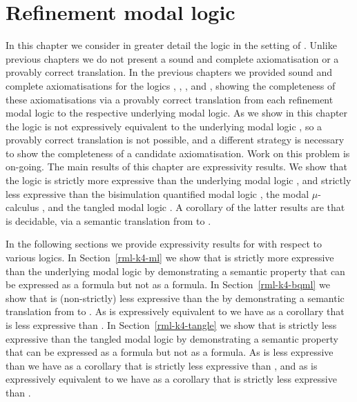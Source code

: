 \chapter{Refinement modal logic \classKF{}}\label{rml-k4}

In this chapter we consider in greater detail the logic \logicRmlKF{} in the setting of \classKF{}.
Unlike previous chapters we do not present a sound and complete axiomatisation or a provably correct translation.
In the previous chapters we provided sound and complete axiomatisations for the logics \logicRmlK{}, \logicRmlKFF{}, \logicRmlKD{}, and \logicRmlS{}, showing the completeness of these axiomatisations via a provably correct translation from each refinement modal logic to the respective underlying modal logic.
As we show in this chapter the logic \logicRmlKF{} is not expressively equivalent to the underlying modal logic \logicKF{}, so a provably correct translation is not possible, and a different strategy is necessary to show the completeness of a candidate axiomatisation.
Work on this problem is on-going.
The main results of this chapter are expressivity results.
We show that the logic \logicRmlKF{} is strictly more expressive than the underlying modal logic \logicKF{}, and strictly less expressive than the bisimulation quantified modal logic \logicBqmlKF{}, the modal $\mu$-calculus \logicMuKF{}, and the tangled modal logic \logicTangleKF{}.
A corollary of the latter results are that \logicRmlKF{} is decidable, via a semantic translation from \langRml{} to \langMu{}.

In the following sections we provide expressivity results for \logicRmlKF{} with respect to various logics.
In Section~\ref{rml-k4-ml} we show that \logicRmlKF{} is strictly more expressive than the underlying modal logic \logicKF{} by demonstrating a semantic property that can be expressed as a \langRml{} formula but not as a \langMl{} formula.
In Section~\ref{rml-k4-bqml} we show that \logicRmlKF{} is (non-strictly) less expressive than the \logicBqmlKF{} by demonstrating a semantic translation from \langRml{} to \langBqml{}.
As \logicBqmlKF{} is expressively equivalent to \logicMuKF{} we have as a corollary that \logicRmlKF{} is less expressive than \logicMuKF{}.
In Section~\ref{rml-k4-tangle} we show that \logicRmlKF{} is strictly less expressive than the tangled modal logic \logicTangleKF{} by demonstrating a semantic property that can be expressed as a \langTangle{} formula but not as a \langRml{} formula.
As \logicTangle{} is less expressive than \logicMuKF{} we have as a corollary that \logicRmlKF{} is strictly less expressive than \logicMuKF{}, and as \logicMuKF{} is expressively equivalent to \logicBqmlKF{} we have as a corollary that \logicRmlKF{} is strictly less expressive than \logicBqmlKF{}.

